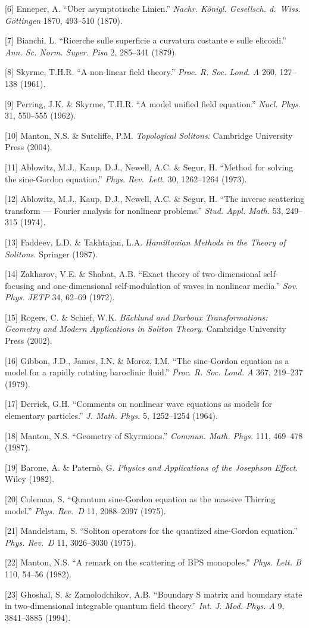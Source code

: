 \documentclass[a4paper,11pt]{ltjsarticle}
\begin{document}
{[}6{]} Enneper, A. ``Über asymptotische Linien.'' \emph{Nachr. Königl.
Gesellsch. d.~Wiss. Göttingen} 1870, 493--510 (1870).

{[}7{]} Bianchi, L. ``Ricerche sulle superficie a curvatura costante e
sulle elicoidi.'' \emph{Ann. Sc. Norm. Super. Pisa} 2, 285--341 (1879).

{[}8{]} Skyrme, T.H.R. ``A non-linear field theory.'' \emph{Proc. R.
Soc. Lond. A} 260, 127--138 (1961).

{[}9{]} Perring, J.K. \& Skyrme, T.H.R. ``A model unified field
equation.'' \emph{Nucl. Phys.} 31, 550--555 (1962).

{[}10{]} Manton, N.S. \& Sutcliffe, P.M. \emph{Topological Solitons.}
Cambridge University Press (2004).

{[}11{]} Ablowitz, M.J., Kaup, D.J., Newell, A.C. \& Segur, H. ``Method
for solving the sine-Gordon equation.'' \emph{Phys. Rev.~Lett.} 30,
1262--1264 (1973).

{[}12{]} Ablowitz, M.J., Kaup, D.J., Newell, A.C. \& Segur, H. ``The
inverse scattering transform --- Fourier analysis for nonlinear
problems.'' \emph{Stud. Appl. Math.} 53, 249--315 (1974).

{[}13{]} Faddeev, L.D. \& Takhtajan, L.A. \emph{Hamiltonian Methods in
the Theory of Solitons.} Springer (1987).

{[}14{]} Zakharov, V.E. \& Shabat, A.B. ``Exact theory of
two-dimensional self-focusing and one-dimensional self-modulation of
waves in nonlinear media.'' \emph{Sov. Phys. JETP} 34, 62--69 (1972).

{[}15{]} Rogers, C. \& Schief, W.K. \emph{Bäcklund and Darboux
Transformations: Geometry and Modern Applications in Soliton Theory.}
Cambridge University Press (2002).

{[}16{]} Gibbon, J.D., James, I.N. \& Moroz, I.M. ``The sine-Gordon
equation as a model for a rapidly rotating baroclinic fluid.''
\emph{Proc. R. Soc. Lond. A} 367, 219--237 (1979).

{[}17{]} Derrick, G.H. ``Comments on nonlinear wave equations as models
for elementary particles.'' \emph{J. Math. Phys.} 5, 1252--1254 (1964).

{[}18{]} Manton, N.S. ``Geometry of Skyrmions.'' \emph{Commun. Math.
Phys.} 111, 469--478 (1987).

{[}19{]} Barone, A. \& Paternò, G. \emph{Physics and Applications of the
Josephson Effect.} Wiley (1982).

{[}20{]} Coleman, S. ``Quantum sine-Gordon equation as the massive
Thirring model.'' \emph{Phys. Rev.~D} 11, 2088--2097 (1975).

{[}21{]} Mandelstam, S. ``Soliton operators for the quantized
sine-Gordon equation.'' \emph{Phys. Rev.~D} 11, 3026--3030 (1975).

{[}22{]} Manton, N.S. ``A remark on the scattering of BPS monopoles.''
\emph{Phys. Lett. B} 110, 54--56 (1982).

{[}23{]} Ghoshal, S. \& Zamolodchikov, A.B. ``Boundary S matrix and
boundary state in two-dimensional integrable quantum field theory.''
\emph{Int. J. Mod. Phys. A} 9, 3841--3885 (1994).
\end{document}
